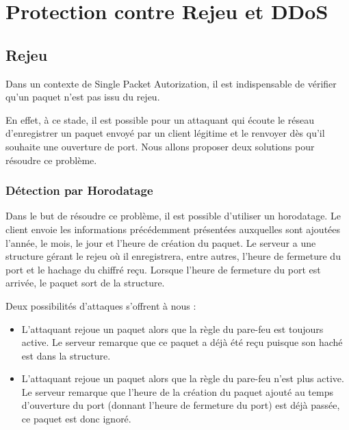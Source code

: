 \chapter{Protection contre Rejeu et DDoS}

\section{Rejeu}

Dans un contexte de Single Packet Autorization, il est indispensable de vérifier qu'un paquet n'est pas issu du rejeu.

En effet, à ce stade, il est possible pour un attaquant qui écoute le réseau d'enregistrer un paquet envoyé par un client légitime et le renvoyer dès qu'il souhaite une ouverture de port. Nous allons proposer deux solutions pour résoudre ce problème.

\subsection{Détection par Horodatage}

Dans le but de résoudre ce problème, il est possible d'utiliser un horodatage. Le client envoie les informations précédemment présentées auxquelles sont ajoutées l'année, le mois, le jour et l'heure de création du paquet. Le serveur a une structure gérant le rejeu où il enregistrera, entre autres, l'heure de fermeture du port et le hachage du chiffré reçu. Lorsque l'heure de fermeture du port est arrivée, le paquet sort de la structure.

Deux possibilités d'attaques s'offrent à nous :

\begin{itemize}

\item L'attaquant rejoue un paquet alors que la règle du pare-feu est toujours active. Le serveur remarque que ce paquet a déjà été reçu puisque son haché est dans la structure.

\item L'attaquant rejoue un paquet alors que la règle du pare-feu n'est plus active. Le serveur remarque que l'heure de la création du paquet ajouté au temps d'ouverture du port (donnant l'heure de fermeture du port) est déjà passée, ce paquet est donc ignoré.

\end{itemize}

\vspace{0.5cm}

